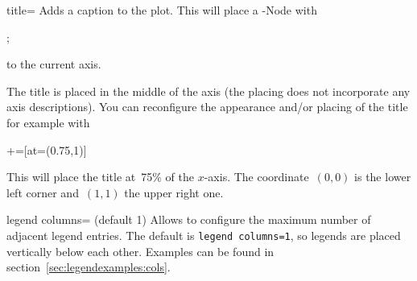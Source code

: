 \begin{pgfplotskey}{title=}
Adds a caption to the plot. This will place a \Tikz-Node with
\begin{codeexample}
;
\end{codeexample}
to the current axis.
\begin{codeexample}[]
%
\end{codeexample}
% 
 The title is placed in the middle of the axis (the placing does not incorporate any axis descriptions). You can reconfigure the appearance and/or placing of the title for example with
\begin{codeexample}
+=[at={(0.75,1)}]
\end{codeexample}
This will place the title at~75\% of the $x$-axis. The coordinate~$(0,0)$ is the lower left corner and~$(1,1)$ the upper right one.
\end{pgfplotskey}

\begin{pgfplotskey}{legend columns= (default 1)}
Allows to configure the maximum number of adjacent legend entries. The default is \texttt{legend columns=1}, so legends are placed vertically below each other. Examples can be found in section~\ref{sec:legendexamples:cols}.
\end{pgfplotskey}

